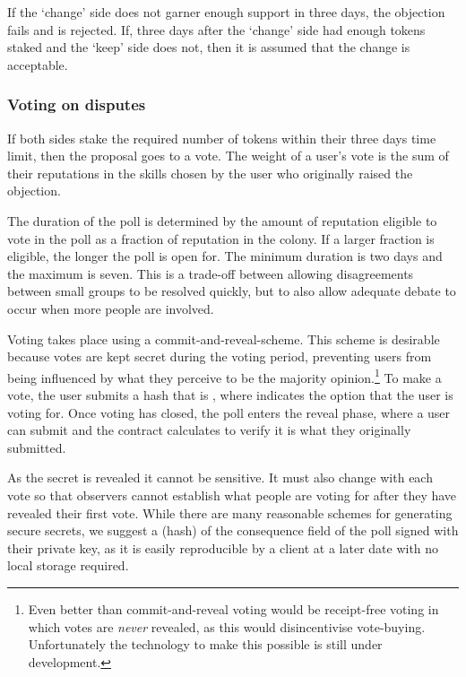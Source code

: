 If the `change' side does not garner enough support in three days, the objection fails and is rejected. If, three days after the `change' side had enough tokens staked and the `keep' side does not, then it is assumed that the change is acceptable.

\subsubsection*{Voting on disputes}

If both sides stake the required number of tokens within their three days time limit, then the proposal goes to a vote. The weight of a user's vote is the sum of their reputations in the skills chosen by the user who originally raised the objection.

The duration of the poll is determined by the amount of reputation eligible to vote in the poll as a fraction of reputation in the colony. If a larger fraction is eligible, the longer the poll is open for. The minimum duration is two days and the maximum is seven. This is a trade-off between allowing disagreements between small groups to be resolved quickly, but to also allow adequate debate to occur when more people are involved.

Voting takes place using a commit-and-reveal-scheme. This scheme is desirable because votes are kept secret during the voting period, preventing users from being influenced by what they perceive to be the majority opinion.\footnote{Even better than commit-and-reveal voting would be receipt-free voting in which votes are \textit{never} revealed, as this would disincentivise vote-buying. Unfortunately the technology to make this possible is still under development.} To make a vote, the user submits a hash that is , where  indicates the option that the user is voting for. Once voting has closed, the poll enters the reveal phase, where a user can submit  and the contract calculates  to verify it is what they originally submitted.

As the secret is revealed it cannot be sensitive. It must also change with each vote so that observers cannot establish what people are voting for after they have revealed their first vote. While there are many reasonable schemes for generating secure secrets, we suggest a (hash) of the consequence field of the poll signed with their private key, as it is easily reproducible by a client at a later date with no local storage required. \\

